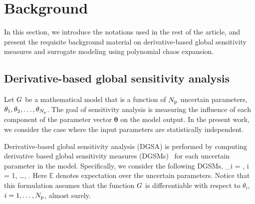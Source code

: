 \section{Background}
\label{sec:bg}

In this section, we introduce the notations used in the rest of
the article, and present the requisite background material on 
derivative-based global sensitivity measures and surrogate modeling 
using polynomial chaos expansion.




\subsection{Derivative-based global sensitivity analysis}  

Let $G$ be a mathematical model that is a function of ${N_\text{p}}$ uncertain 
parameters, $\theta_1, \theta_2, \ldots, \theta_{N_\text{p}}$. The goal of sensitivity analysis
is measuring the influence of each component of the parameter vector 
$\bm{\theta}$ on the model output. 
In the present work, we consider the case where the input parameters are statistically 
independent. 

Derivative-based global sensitivity analysis (DGSA) is performed by 
computing derivative based global sensitivity measures (DGSMs)~\cite{Sobol:2009} 
for each uncertain parameter in the model. 
Specifically, we consider the following DGSMs, 
\be
\mu_i = 
, \quad i = 1, \ldots, \Np.
\label{eq:mu}
\ee
Here $\mathbb{E}$ denotes expectation over the uncertain parameters.
Notice that this formulation assumes that the function $G$ is differentiable
with respect to $\theta_i$, $i = 1, \ldots, {N_\text{p}}$, almost surely.

